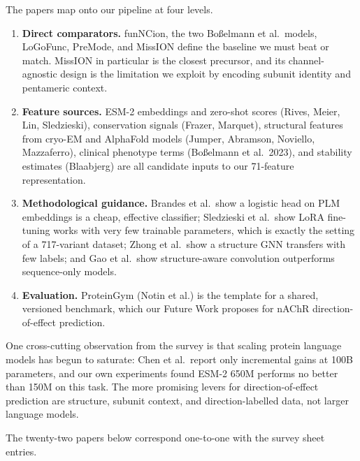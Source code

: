 \documentclass[11pt]{article}
\begin{document}
The papers map onto our pipeline at four levels.

\begin{enumerate}
\item \textbf{Direct comparators.} funNCion, the two Bo{\ss}elmann et al.\
models, LoGoFunc, PreMode, and MissION define the baseline we must beat or
match. MissION in particular is the closest precursor, and its channel-agnostic
design is the limitation we exploit by encoding subunit identity and pentameric
context.
\item \textbf{Feature sources.} ESM-2 embeddings and zero-shot scores (Rives,
Meier, Lin, Sledzieski), conservation signals (Frazer, Marquet), structural
features from cryo-EM and AlphaFold models (Jumper, Abramson, Noviello,
Mazzaferro), clinical phenotype terms (Bo{\ss}elmann et al.\ 2023), and
stability estimates (Blaabjerg) are all candidate inputs to our 71-feature
representation.
\item \textbf{Methodological guidance.} Brandes et al.\ show a logistic head on
PLM embeddings is a cheap, effective classifier; Sledzieski et al.\ show LoRA
fine-tuning works with very few trainable parameters, which is exactly the
setting of a 717-variant dataset; Zhong et al.\ show a structure GNN transfers
with few labels; and Gao et al.\ show structure-aware convolution outperforms
sequence-only models.
\item \textbf{Evaluation.} ProteinGym (Notin et al.) is the template for a
shared, versioned benchmark, which our Future Work proposes for nAChR
direction-of-effect prediction.
\end{enumerate}

One cross-cutting observation from the survey is that scaling protein language
models has begun to saturate: Chen et al.\ report only incremental gains at
100B parameters, and our own experiments found ESM-2 650M performs no better
than 150M on this task. The more promising levers for direction-of-effect
prediction are structure, subunit context, and direction-labelled data, not
larger language models.

The twenty-two papers below correspond one-to-one with the survey sheet entries.
\end{document}
